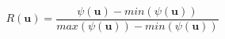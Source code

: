 \documentclass[twoside,twocolumn,10pt]{article}
\begin{document}



\begin{equation}
\label{eq::normglifo}
    R(\bm{u}) = \frac{\psi(\bm{u}) - min(\psi(\bm{u}))}{max(\psi(\bm{u})) - min(\psi(\bm{u}))}
\end{equation}
\end{document}
